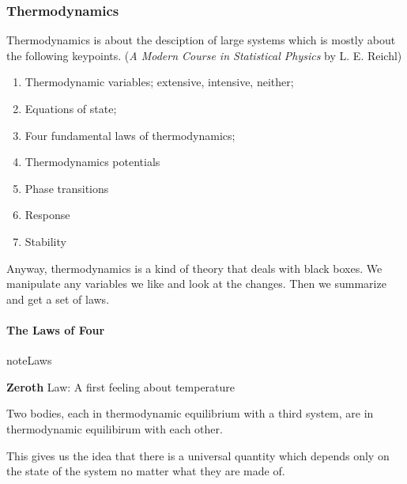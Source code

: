\documentclass[letterpaper,10pt,english]{sphinxmanual}
\begin{document}
\subsubsection{Thermodynamics}
\label{vocabulary/vocabulary:thermodynamics}
Thermodynamics is about the desciption of large systems which is mostly about the following keypoints. (\emph{A Modern Course in Statistical Physics} by L. E. Reichl)
\begin{enumerate}
\item {} 
Thermodynamic variables; extensive, intensive, neither;

\item {} 
Equations of state;

\item {} 
Four fundamental laws of thermodynamics;

\item {} 
Thermodynamics potentials

\item {} 
Phase transitions

\item {} 
Response

\item {} 
Stability

\end{enumerate}

Anyway, thermodynamics is a kind of theory that deals with black boxes. We manipulate any variables we like and look at the changes. Then we summarize and get a set of laws.


\paragraph{The Laws of Four}
\label{vocabulary/vocabulary:the-laws-of-four}\label{vocabulary/vocabulary:index-2}
\begin{notice}{note}{Laws}

\textbf{Zeroth} Law: A first feeling about temperature

Two bodies, each in thermodynamic equilibrium with a third system, are in thermodynamic equilibirum with each other.

This gives us the idea that there is a universal quantity which depends only on the state of the system no matter what they are made of.
\end{notice}
\end{document}
